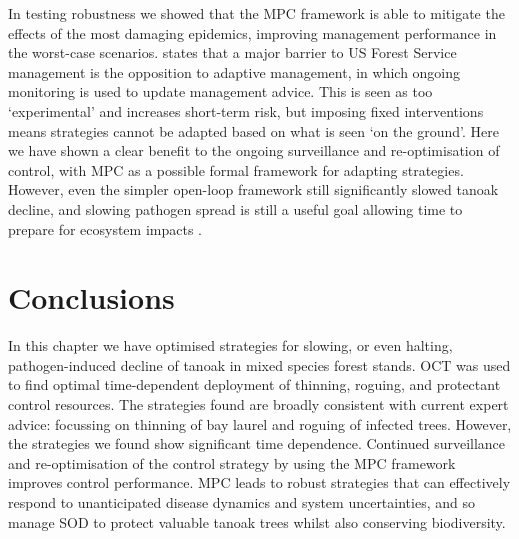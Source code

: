 In testing robustness we showed that the MPC framework is able to mitigate the effects of the most damaging epidemics, improving management performance in the worst-case scenarios. \citet{maccleery_reinventing_2015} states that a major barrier to US Forest Service management is the opposition to adaptive management, in which ongoing monitoring is used to update management advice. This is seen as too `experimental' and increases short-term risk, but imposing fixed interventions means strategies cannot be adapted based on what is seen `on the ground'. Here we have shown a clear benefit to the ongoing surveillance and re-optimisation of control, with MPC as a possible formal framework for adapting strategies. However, even the simpler open-loop framework still significantly slowed tanoak decline, and slowing pathogen spread is still a useful goal allowing time to prepare for ecosystem impacts \citep{cobb_biodiversity_2013}.


\section{Conclusions\label{sec:ch6:conclusions}}

In this chapter we have optimised strategies for slowing, or even halting, pathogen-induced decline of tanoak in mixed species forest stands. OCT was used to find optimal time-dependent deployment of thinning, roguing, and protectant control resources. The strategies found are broadly consistent with current expert advice: focussing on thinning of bay laurel and roguing of infected trees. However, the strategies we found show significant time dependence. Continued surveillance and re-optimisation of the control strategy by using the MPC framework improves control performance. MPC leads to robust strategies that can effectively respond to unanticipated disease dynamics and system uncertainties, and so manage SOD to protect valuable tanoak trees whilst also conserving biodiversity.
